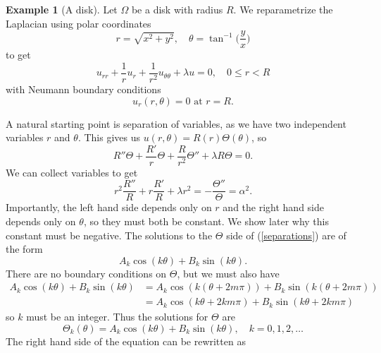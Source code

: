 \documentclass{article}
\numberwithin{equation}{section}
\theoremstyle{definition}
\newtheorem{exmp}[thm]{Example}
\begin{document}
\begin{exmp}[A disk]\label{laplace-disk}
Let $\Omega$ be a disk with radius $R$. We reparametrize the Laplacian using polar coordinates
\begin{equation}
    r = \sqrt{x^2+y^2}, \quad \theta = \tan^{-1}\Big(\frac{y}{x}\Big)
\end{equation}
to get
\begin{equation}\label{circle-problem}
u_{rr} + \frac{1}{r}u_r + \frac{1}{r^2}u_{\theta\theta} + \lambda u = 0, \quad 0 \le r < R
\end{equation}
with Neumann boundary conditions
\begin{equation}\label{circle-boundaries}
u_r(r,\theta) = 0 \text{ at } r = R.
\end{equation}

A natural starting point is separation of variables, as we have two independent variables $r$ and $\theta$. This gives us $u(r,\theta) = R(r)\Theta(\theta)$, so
\begin{equation}
    R''\Theta + \frac{R'}{r}\Theta + \frac{R}{r^2}\Theta'' + \lambda R\Theta = 0.
\end{equation}
We can collect variables to get
\begin{equation}\label{separations}
    r^2\frac{R''}{R} + r\frac{R'}{R} + \lambda r^2 = -\frac{\Theta ''}{\Theta} = \alpha^2.
\end{equation}
Importantly, the left hand side depends only on $r$ and the right hand side depends only on $\theta$, so they must both be constant. We show later why this constant must be negative. The solutions to the $\Theta$ side of (\ref{separations}) are of the form
\begin{equation}
    A_k\cos(k\theta)+B_k\sin(k\theta).
\end{equation}
There are no boundary conditions on $\Theta$, but we must also have
\begin{align}
    A_k\cos(k\theta)+B_k\sin(k\theta) &= A_k\cos(k(\theta + 2m\pi))+B_k\sin(k(\theta + 2m\pi)) \\
    &= A_k\cos(k\theta + 2km\pi)+B_k\sin(k\theta + 2km\pi)
\end{align}
so $k$ must be an integer. Thus the solutions for $\Theta$ are
\begin{equation}\label{theta-sols}
    \Theta_k(\theta) = A_k\cos(k\theta)+B_k\sin(k\theta), \quad k= 0, 1, 2, \ldots
\end{equation}
The right hand side of the equation can be rewritten as
\begin{equation}\label{final-R}

\end{equation}
\end{exmp}
\end{document}

